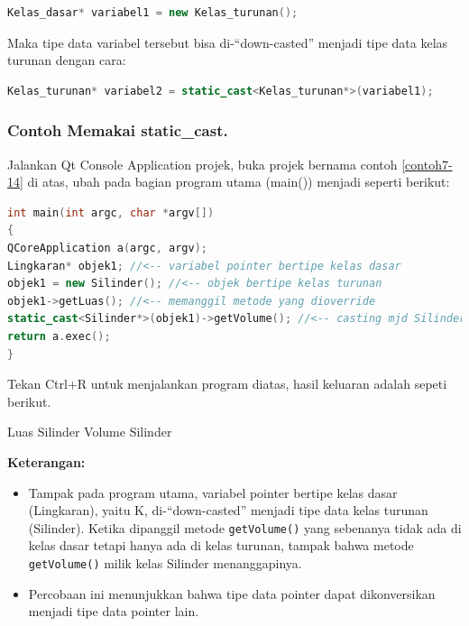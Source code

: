 \begin{lstlisting}[language=c++, numbers=none]
Kelas_dasar* variabel1 = new Kelas_turunan();
\end{lstlisting}

Maka tipe data variabel tersebut bisa di-``down-casted'' menjadi tipe
data kelas turunan dengan cara:

\begin{lstlisting}[language=c++, numbers=none]
Kelas_turunan* variabel2 = static_cast<Kelas_turunan*>(variabel1);
\end{lstlisting}

\subsubsection*{Contoh  Memakai static\_cast.}

Jalankan Qt Console Application projek, buka projek bernama contoh \ref{contoh7-14} di
atas, ubah pada bagian program utama (main()) menjadi seperti berikut:

\begin{lstlisting}[language=c++, caption=Memakai static\_cast, label=contoh7-14]
int main(int argc, char *argv[])
{
QCoreApplication a(argc, argv);
Lingkaran* objek1; //<-- variabel pointer bertipe kelas dasar
objek1 = new Silinder(); //<-- objek bertipe kelas turunan
objek1->getLuas(); //<-- memanggil metode yang dioverride
static_cast<Silinder*>(objek1)->getVolume(); //<-- casting mjd Silinder
return a.exec();
}
\end{lstlisting}

Tekan Ctrl+R untuk menjalankan program diatas, hasil keluaran adalah
sepeti berikut.

\begin{lcverbatim}
Luas Silinder
Volume Silinder
\end{lcverbatim}

\textbf{Keterangan:}

\begin{itemize}

\item
  Tampak pada program utama, variabel pointer bertipe kelas dasar
  (Lingkaran), yaitu K, di-``down-casted'' menjadi tipe data kelas
  turunan (Silinder). Ketika dipanggil metode \texttt{getVolume()} yang
  sebenanya tidak ada di kelas dasar tetapi hanya ada di kelas turunan,
  tampak bahwa metode \texttt{getVolume()} milik kelas Silinder
  menanggapinya.
\item
  Percobaan ini menunjukkan bahwa tipe data pointer dapat dikonversikan
  menjadi tipe data pointer lain.
\end{itemize}

